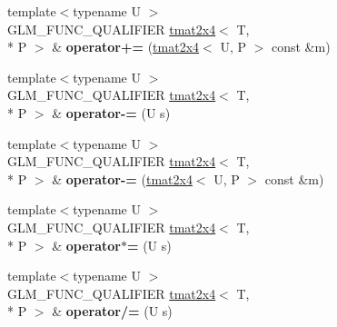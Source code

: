 \begin{DoxyCompactItemize}
\item 
\hypertarget{structglm_1_1detail_1_1tmat2x4_af83887f4894721e8b28d9253fb616700}{{\footnotesize template$<$typename U $>$ }\\G\-L\-M\-\_\-\-F\-U\-N\-C\-\_\-\-Q\-U\-A\-L\-I\-F\-I\-E\-R \hyperlink{structglm_1_1detail_1_1tmat2x4}{tmat2x4}$<$ T, \\*
P $>$ \& {\bfseries operator+=} (\hyperlink{structglm_1_1detail_1_1tmat2x4}{tmat2x4}$<$ U, P $>$ const \&m)}\label{structglm_1_1detail_1_1tmat2x4_af83887f4894721e8b28d9253fb616700}

\item 
\hypertarget{structglm_1_1detail_1_1tmat2x4_a0289438555ea967c110a13f4df846953}{{\footnotesize template$<$typename U $>$ }\\G\-L\-M\-\_\-\-F\-U\-N\-C\-\_\-\-Q\-U\-A\-L\-I\-F\-I\-E\-R \hyperlink{structglm_1_1detail_1_1tmat2x4}{tmat2x4}$<$ T, \\*
P $>$ \& {\bfseries operator-\/=} (U s)}\label{structglm_1_1detail_1_1tmat2x4_a0289438555ea967c110a13f4df846953}

\item 
\hypertarget{structglm_1_1detail_1_1tmat2x4_a7f1203e2377c0b0f9e5c1a1bb68006a7}{{\footnotesize template$<$typename U $>$ }\\G\-L\-M\-\_\-\-F\-U\-N\-C\-\_\-\-Q\-U\-A\-L\-I\-F\-I\-E\-R \hyperlink{structglm_1_1detail_1_1tmat2x4}{tmat2x4}$<$ T, \\*
P $>$ \& {\bfseries operator-\/=} (\hyperlink{structglm_1_1detail_1_1tmat2x4}{tmat2x4}$<$ U, P $>$ const \&m)}\label{structglm_1_1detail_1_1tmat2x4_a7f1203e2377c0b0f9e5c1a1bb68006a7}

\item 
\hypertarget{structglm_1_1detail_1_1tmat2x4_a3d1fb988d316f24267ca8349b5627be8}{{\footnotesize template$<$typename U $>$ }\\G\-L\-M\-\_\-\-F\-U\-N\-C\-\_\-\-Q\-U\-A\-L\-I\-F\-I\-E\-R \hyperlink{structglm_1_1detail_1_1tmat2x4}{tmat2x4}$<$ T, \\*
P $>$ \& {\bfseries operator$\ast$=} (U s)}\label{structglm_1_1detail_1_1tmat2x4_a3d1fb988d316f24267ca8349b5627be8}

\item 
\hypertarget{structglm_1_1detail_1_1tmat2x4_a84f40f6dabc1767c21dd5440f038a363}{{\footnotesize template$<$typename U $>$ }\\G\-L\-M\-\_\-\-F\-U\-N\-C\-\_\-\-Q\-U\-A\-L\-I\-F\-I\-E\-R \hyperlink{structglm_1_1detail_1_1tmat2x4}{tmat2x4}$<$ T, \\*
P $>$ \& {\bfseries operator/=} (U s)}\label{structglm_1_1detail_1_1tmat2x4_a84f40f6dabc1767c21dd5440f038a363}

\end{DoxyCompactItemize}


